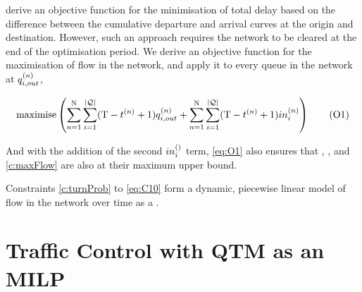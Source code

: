 
 derive an objective function for the minimisation of
total delay based on the difference between the cumulative departure and arrival
curves at the origin and destination. However, such an approach requires the
network to be cleared at the end of the optimisation period. We derive an
objective function for the maximisation of flow in the network, and apply it to
every queue in the network at $\qout{i}$,


\begin{equation}
\textrm{maximise} \left( \sum\limits_{n=1}^{\Nn} \sum\limits_{i=1}^{\Qn} (\TMAX - \tn + 1) \qout{i} + \sum\limits_{n=1}^{\Nn} \sum\limits_{i=1}^{\Qn} (\TMAX - \tn + 1) \inq{i} \right) 
\tag{O1}\label{eq:O1}
\end{equation}

And with the addition of the second $\inq[]{i}$ term, \ref{eq:O1} also ensures
that , , and \ref{c:maxFlow} are also at their maximum upper
bound.



Constraints \ref{c:turnProb} to \ref{eq:C10} form a dynamic, piecewise linear model
of flow in the network over time as a .




\section{Traffic Control with QTM as an MILP}






